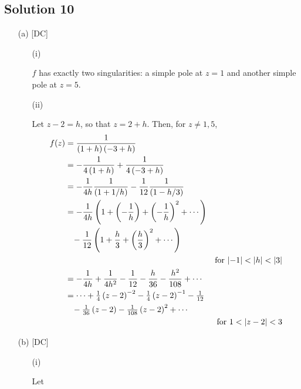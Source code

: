 
%
%

\subsection*{Solution 10}

\begin{itemize}
\item[(a)][DC]

\begin{itemize}
\item[(i)]

$f$ has exactly two singularities: a simple pole at $ z = 1 $ and
another simple pole at $ z = 5 $.

\item[(ii)]

Let $ z - 2 = h $, so that $ z = 2 + h $. Then, for $ z \neq 1 , 5 $,
\begin{align*}
	f ( z )
	&=
	\frac{1}{\left(1 + h\right)\left(-3 + h\right)}
	\\
	&=
	- \frac{1}{4 \left( 1 + h \right)} + \frac{1}{4 \left( -3 + h \right)}
	\\
	&=
	- \frac{1}{4 h} \frac{1}{\left( 1 + 1/h \right)} - \frac{1}{12} \frac{1}{\left( 1 - h/3 \right)}
	\\
	&=
	- \frac{1}{4 h} \left( 1 + \left(-\frac{1}{h}\right) + \left(-\frac{1}{h}\right)^2 + \cdots \right)
	\\
	&
	\;\;\;- \frac{1}{12} \left( 1 + \frac{h}{3} + \left(\frac{h}{3}\right)^2 + \cdots \right)
	\\
	&&\text{for $ \left\lvert-1\right\rvert < \left\lvert h\right\rvert < \left\lvert3\right\rvert $}
	\\
	&=
	- \frac{1}{4 h} + \frac{1}{4 h^2} - \frac{1}{12} - \frac{h}{36} - \frac{h^2}{108} + \cdots
	\\
	&=
	\cdots + \tfrac{1}{4} \left(z - 2\right)^{-2} - \tfrac{1}{4} \left(z - 2\right)^{-1} - \tfrac{1}{12}
	\\
	&
	\;\;\;- \tfrac{1}{36} \left(z - 2\right) - \tfrac{1}{108} \left(z - 2\right)^2 + \cdots
	\\
	&&\text{for $ 1 < \left\lvert z - 2\right\rvert < 3 $}
\end{align*}

\end{itemize}

\item[(b)][DC]

\begin{itemize}
\item[(i)]

Let


\end{itemize}
\end{itemize}
